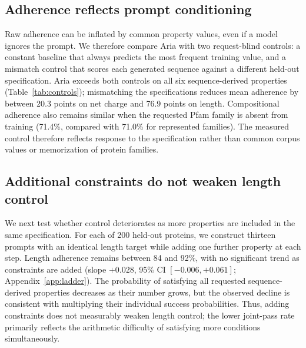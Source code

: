 \documentclass{article}
\begin{document}
\subsection{Adherence reflects prompt conditioning}

Raw adherence can be inflated by common property values, even if a model ignores
the prompt. We therefore compare Aria with two request-blind controls: a constant
baseline that always predicts the most frequent training value, and a mismatch
control that scores each generated sequence against a different held-out
specification. Aria exceeds both controls on all six sequence-derived properties
(Table~\ref{tab:controls}); mismatching the specifications reduces mean adherence by between 20.3 points on net charge and 76.9 points on length. Compositional adherence also remains similar when the requested Pfam
family is absent from training (71.4\%, compared with 71.0\% for represented
families). The measured control therefore reflects response to the specification
rather than common corpus values or memorization of protein families.

\subsection{Additional constraints do not weaken length control}

We next test whether control deteriorates as more properties are included in the same specification. For each of 200 held-out proteins, we construct thirteen prompts with an identical length target while adding one further property at each step. Length adherence remains between 84 and 92\%, with no significant trend as constraints are added (slope $+0.028$, 95\% CI $[-0.006,+0.061]$; Appendix~\ref{app:ladder}). The probability of satisfying all requested sequence-derived properties decreases as their number grows, but the observed decline is consistent with multiplying their individual success probabilities. Thus, adding constraints does not measurably weaken length control; the lower joint-pass rate primarily reflects the arithmetic difficulty of satisfying more conditions simultaneously.
\end{document}
